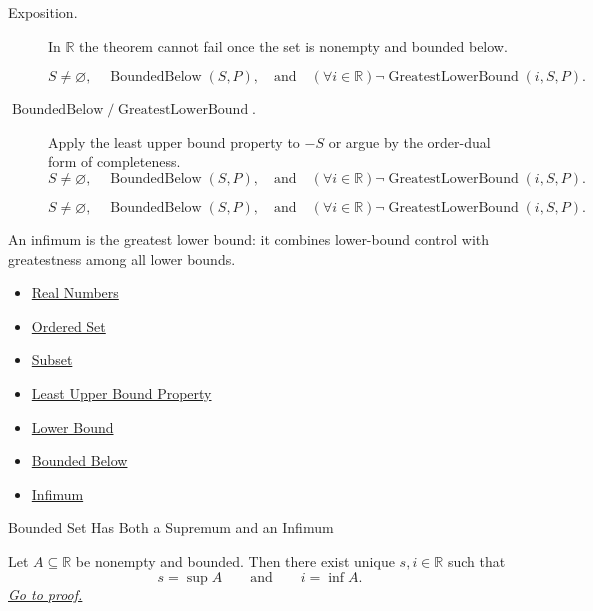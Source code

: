 \begin{remark*}
\begin{description}
  \item[Exposition.]
  In $\mathbb{R}$ the theorem cannot fail once the set is nonempty and
  bounded below.

  
\[
S\neq\varnothing,\quad
  \operatorname{BoundedBelow}(S,P),
  \quad\text{and}\quad
  (\forall i\in\mathbb{R})\neg\operatorname{GreatestLowerBound}(i,S,P).
\]
  \item[\(\operatorname{BoundedBelow} / \operatorname{GreatestLowerBound}.\)]
  Apply the least upper bound property to $-S$ or argue by the order-dual
  form of completeness.
  \[
    S\neq\varnothing,\quad
    \operatorname{BoundedBelow}(S,P),
    \quad\text{and}\quad
    (\forall i\in\mathbb{R})\neg\operatorname{GreatestLowerBound}(i,S,P).
  \]

\[
    S\neq\varnothing,\quad
    \operatorname{BoundedBelow}(S,P),
    \quad\text{and}\quad
    (\forall i\in\mathbb{R})\neg\operatorname{GreatestLowerBound}(i,S,P).
  \]
\end{description}
\end{remark*}

\begin{remark*}[Interpretation]
An infimum is the greatest lower bound: it combines lower-bound control with greatestness among all lower bounds.
\end{remark*}

\begin{dependencies}
\begin{itemize}
  \item \hyperref[def:reals]{Real Numbers}
  \item \hyperref[def:ordered-set]{Ordered Set}
  \item \hyperref[def:subset]{Subset}
  \item \hyperref[def:least-upper-bound-property]{Least Upper Bound Property}
  \item \hyperref[def:real-lower-bound]{Lower Bound}
  \item \hyperref[def:bounded-below]{Bounded Below}
  \item \hyperref[def:infimum]{Infimum}
\end{itemize}
\end{dependencies}

\begin{corollarybox}{Bounded Set Has Both a Supremum and an Infimum}
\begin{corollary}
\label{cor:bounded-set-has-supremum-and-infimum}
Let $A\subseteq\mathbb{R}$ be nonempty and bounded. Then there exist unique
$s,i\in\mathbb{R}$ such that
\[
  s=\sup A \qquad\text{and}\qquad i=\inf A.
\]
\hyperref[prf:bounded-set-has-supremum-and-infimum]{\textit{Go to proof.}}
\end{corollary}
\end{corollarybox}

